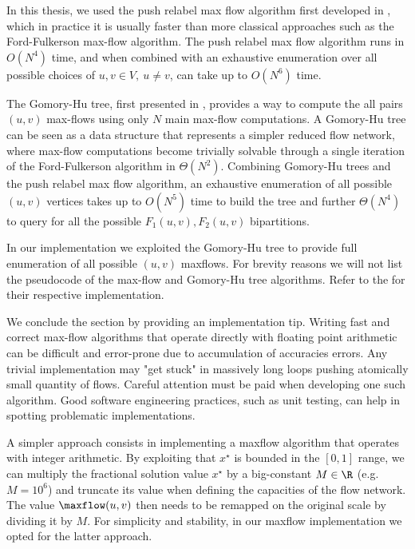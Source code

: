 \medskip

In this thesis,
we used the push relabel max flow algorithm first developed in \cite{goldberg1997},
which in practice it is usually faster than more classical approaches such as the Ford-Fulkerson max-flow algorithm.
The push relabel max flow algorithm runs in $O(N^4)$ time,
and when combined with an exhaustive enumeration over all possible choices of $u, v \in V,\ u \ne v$,
can take up to $O(N^6)$ time.

The Gomory-Hu tree, first presented in \cite{gomory1961},
provides a way to compute the all pairs $(u, v)$ max-flows using only $N$ main max-flow computations.
A Gomory-Hu tree can be seen as a data structure that represents a simpler reduced flow network,
where max-flow computations become trivially solvable
through a single iteration of the Ford-Fulkerson algorithm in $\Theta(N^2)$.
Combining Gomory-Hu trees and the push relabel max flow algorithm,
an exhaustive enumeration of all possible $(u, v)$ vertices takes up to $O(N^5)$ time to build the tree
and further $\Theta(N^4)$ to query for all the possible $F_1(u, v), F_2(u, v)$ bipartitions.

In our implementation
we exploited the Gomory-Hu tree to provide full enumeration of all possible $(u, v)$ maxflows.
For brevity reasons we will not list the pseudocode of the max-flow and Gomory-Hu tree algorithms.
Refer to the  for their respective implementation.

\medskip

We conclude the section by providing an implementation tip.
Writing fast and correct max-flow algorithms that operate directly with floating point arithmetic
can be difficult and error-prone due to accumulation of accuracies errors.
Any trivial implementation may "get stuck" in massively long loops pushing atomically small quantity of flows.
Careful attention must be paid when developing one such algorithm.
Good software engineering practices, such as unit testing, can help in spotting problematic implementations.

A simpler approach consists in implementing a maxflow algorithm that operates with integer arithmetic.
By exploiting that $x^\star$ is bounded in the $[0, 1]$ range,
we can multiply the fractional solution value $x^\star$ by a big-constant $M \in \R$ (e.g. $M = 10^6$)
and truncate its value when defining the capacities of the flow network.
The value $\maxflow(u, v)$ then needs to be remapped on the original scale
by dividing it by $M$.
For simplicity and stability, in our maxflow implementation we opted for the latter approach.

